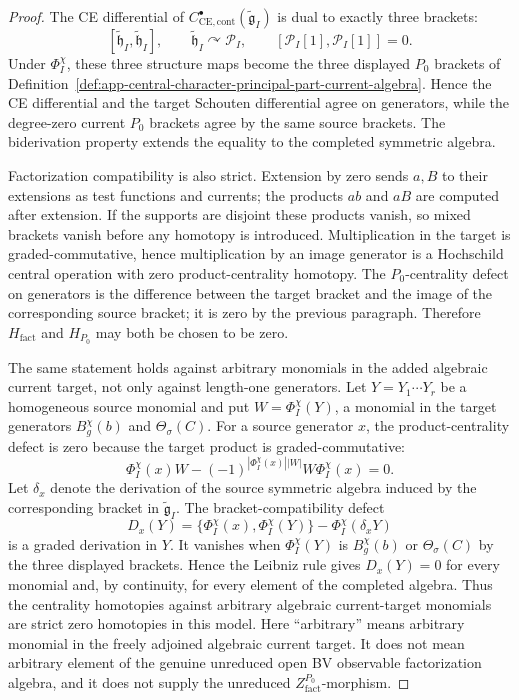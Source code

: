 \begin{proof}
  The CE differential of
  \(C^\bullet_{\mathrm{CE},\mathrm{cont}}(\widetilde{\mathfrak g}_I)\)
  is dual to exactly three brackets:
  \[
    [\widetilde{\mathfrak h}_I,\widetilde{\mathfrak h}_I],
    \qquad
    \widetilde{\mathfrak h}_I\curvearrowright\mathcal P_I,
    \qquad
    [\mathcal P_I[1],\mathcal P_I[1]]=0 .
  \]
  Under \(\Phi_I^\chi\), these three structure maps become the three
  displayed \(P_0\) brackets of
  Definition~\ref{def:app-central-character-principal-part-current-algebra}.
  Hence the CE differential and the target Schouten differential agree
  on generators, while the degree-zero current \(P_0\) brackets agree
  by the same source brackets.  The biderivation property extends the
  equality to the completed symmetric algebra.

  Factorization compatibility is also strict.  Extension by zero sends
  \(a,B\) to their extensions as test functions and currents; the
  products \(ab\) and \(aB\) are computed after extension.  If the
  supports are disjoint these products vanish, so mixed brackets vanish
  before any homotopy is introduced.  Multiplication in the target is
  graded-commutative, hence multiplication by an image generator is a
  Hochschild central operation with zero product-centrality homotopy.
  The \(P_0\)-centrality defect on generators is the difference between
  the target bracket and the image of the corresponding source bracket;
  it is zero by the previous paragraph.  Therefore
  \(H_{\mathrm{fact}}\) and \(H_{P_0}\) may both be chosen to be zero.

  The same statement holds against arbitrary monomials in the added
  algebraic current target, not only against length-one generators.  Let
  \(Y=Y_1\cdots Y_r\) be a homogeneous source monomial and put
  \(W=\Phi_I^\chi(Y)\), a monomial in the target generators
  \(B_g^\chi(b)\) and \(\Theta_\sigma(C)\).  For a source generator
  \(x\), the product-centrality defect is zero because the target
  product is graded-commutative:
  \[
    \Phi_I^\chi(x)W-(-1)^{|\Phi_I^\chi(x)||W|}W\Phi_I^\chi(x)=0 .
  \]
  Let \(\delta_x\) denote the derivation of the source symmetric
  algebra induced by the corresponding bracket in
  \(\widetilde{\mathfrak g}_I\).  The bracket-compatibility defect
  \[
    D_x(Y)=\{\Phi_I^\chi(x),\Phi_I^\chi(Y)\}
      -\Phi_I^\chi(\delta_xY)
  \]
  is a graded derivation in \(Y\).  It vanishes when \(\Phi_I^\chi(Y)\)
  is \(B_g^\chi(b)\) or \(\Theta_\sigma(C)\) by the three
  displayed brackets.  Hence the Leibniz rule gives \(D_x(Y)=0\) for
  every monomial and, by continuity, for every element of the completed
  algebra.  Thus the centrality homotopies against arbitrary algebraic
  current-target monomials are strict zero homotopies in this model.
  Here ``arbitrary'' means arbitrary monomial in the freely adjoined
  algebraic current target.  It does not mean arbitrary element of the
  genuine unreduced open BV observable factorization algebra, and it
  does not supply the unreduced
  \(Z^{P_0}_{\mathrm{fact}}\)-morphism.
\end{proof}

